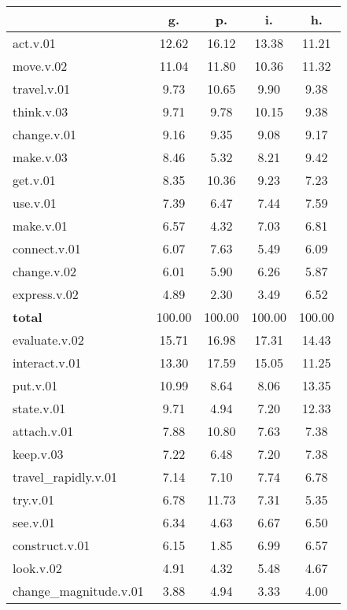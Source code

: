 \begin{table}[h!]
\begin{center}
\begin{tabular}{| l || c | c | c | c |}\hline
 & {\bf g.} & {\bf p.} & {\bf i.} & {\bf h.} \\\hline\hline
act.v.01 & 12.62  & 16.12  & 13.38  & 11.21 \\\hline
move.v.02 & 11.04  & 11.80  & 10.36  & 11.32 \\\hline
travel.v.01 & 9.73  & 10.65  & 9.90  & 9.38 \\\hline
think.v.03 & 9.71  & 9.78  & 10.15  & 9.38 \\\hline
change.v.01 & 9.16  & 9.35  & 9.08  & 9.17 \\\hline
make.v.03 & 8.46  & 5.32  & 8.21  & 9.42 \\\hline
get.v.01 & 8.35  & 10.36  & 9.23  & 7.23 \\\hline
use.v.01 & 7.39  & 6.47  & 7.44  & 7.59 \\\hline
make.v.01 & 6.57  & 4.32  & 7.03  & 6.81 \\\hline
connect.v.01 & 6.07  & 7.63  & 5.49  & 6.09 \\\hline
change.v.02 & 6.01  & 5.90  & 6.26  & 5.87 \\\hline
express.v.02 & 4.89  & 2.30  & 3.49  & 6.52 \\\hline\hline
{{\bf total}} & 100.00  & 100.00  & 100.00  & 100.00 \\\hline\hline\hline
evaluate.v.02 & 15.71  & 16.98  & 17.31  & 14.43 \\\hline
interact.v.01 & 13.30  & 17.59  & 15.05  & 11.25 \\\hline
put.v.01 & 10.99  & 8.64  & 8.06  & 13.35 \\\hline
state.v.01 & 9.71  & 4.94  & 7.20  & 12.33 \\\hline
attach.v.01 & 7.88  & 10.80  & 7.63  & 7.38 \\\hline
keep.v.03 & 7.22  & 6.48  & 7.20  & 7.38 \\\hline
travel\_rapidly.v.01 & 7.14  & 7.10  & 7.74  & 6.78 \\\hline
try.v.01 & 6.78  & 11.73  & 7.31  & 5.35 \\\hline
see.v.01 & 6.34  & 4.63  & 6.67  & 6.50 \\\hline
construct.v.01 & 6.15  & 1.85  & 6.99  & 6.57 \\\hline
look.v.02 & 4.91  & 4.32  & 5.48  & 4.67 \\\hline
change\_magnitude.v.01 & 3.88  & 4.94  & 3.33  & 4.00 \\\hline\hline

\end{tabular}
\end{center}
\end{table}
